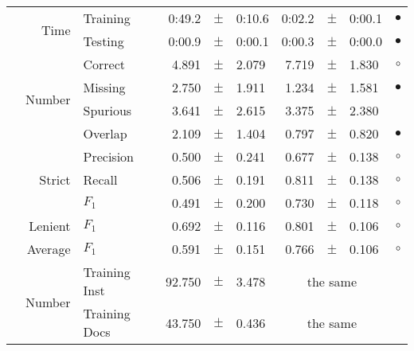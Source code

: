 \begin{longtable}{|r|r|l||rcl|rcl|c|}
\cline{2-10} & \multirow{2}{*}{      Time} &        Training &      0:49.2 &  $\pm$  &      0:10.6 &      0:02.2 &  $\pm$  &      0:00.1 & $\bullet$ \\
\cline{3-10} &                             &         Testing &      0:00.9 &  $\pm$  &      0:00.1 &      0:00.3 &  $\pm$  &      0:00.0 & $\bullet$ \\
\hline
\pagebreak
\hline
\hline
\multirow{11}{*}{\begin{sideways}professional unit\end{sideways} }
             & \multirow{4}{*}{    Number} &         Correct &       4.891 &  $\pm$  &       2.079 &       7.719 &  $\pm$  &       1.830 & $\circ$ \\
\cline{3-10} &                             &         Missing &       2.750 &  $\pm$  &       1.911 &       1.234 &  $\pm$  &       1.581 & $\bullet$ \\
\cline{3-10} &                             &        Spurious &       3.641 &  $\pm$  &       2.615 &       3.375 &  $\pm$  &       2.380 &  \\
\cline{3-10} &                             &         Overlap &       2.109 &  $\pm$  &       1.404 &       0.797 &  $\pm$  &       0.820 & $\bullet$ \\
\cline{2-10} & \multirow{3}{*}{    Strict} &       Precision &       0.500 &  $\pm$  &       0.241 &       0.677 &  $\pm$  &       0.138 & $\circ$ \\
\cline{3-10} &                             &          Recall &       0.506 &  $\pm$  &       0.191 &       0.811 &  $\pm$  &       0.138 & $\circ$ \\
\cline{3-10} &                             &           $F_1$ &       0.491 &  $\pm$  &       0.200 &       0.730 &  $\pm$  &       0.118 & $\circ$ \\
\cline{2-10} &                     Lenient &           $F_1$ &       0.692 &  $\pm$  &       0.116 &       0.801 &  $\pm$  &       0.106 & $\circ$ \\
\cline{2-10} &                     Average &           $F_1$ &       0.591 &  $\pm$  &       0.151 &       0.766 &  $\pm$  &       0.106 & $\circ$ \\
\cline{2-10} & \multirow{2}{*}{    Number} &   Training Inst &      92.750 &  $\pm$  &       3.478 &    \multicolumn{3}{c|}{the same}         &  \\
\cline{3-10} &                             &   Training Docs &      43.750 &  $\pm$  &       0.436 &    \multicolumn{3}{c|}{the same}         &  \\

\end{longtable}
